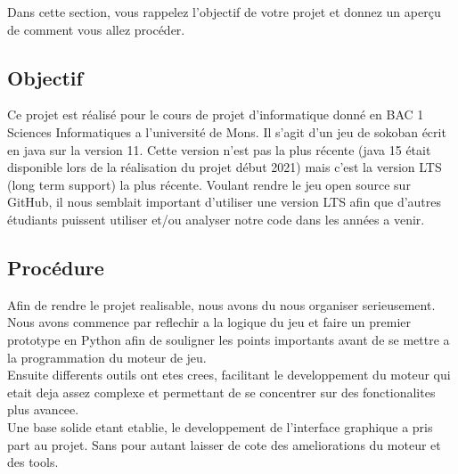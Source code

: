 \documentclass[../main.tex]{subfiles}
\begin{document}
Dans cette section, vous rappelez l'objectif de votre projet et donnez un aperçu de comment vous allez procéder.

\subsection{Objectif}
Ce projet est réalisé pour le cours de projet d'informatique donné en BAC 1 Sciences Informatiques a l'université de Mons.
Il s'agit d'un jeu de sokoban écrit en java sur la version 11.
Cette version n'est pas la plus récente (java 15 était disponible lors de la réalisation du projet début 2021) mais c'est la version LTS (long term support) la plus récente.
Voulant rendre le jeu open source sur GitHub, il nous semblait important d'utiliser une version LTS afin que d'autres étudiants puissent utiliser et/ou analyser notre code dans les années a venir.

\subsection{Procédure}
Afin de rendre le projet realisable, nous avons du nous organiser serieusement. \\
Nous avons commence par reflechir a la logique du jeu et faire un premier prototype en Python afin de souligner les points importants avant de se mettre a la programmation du moteur de jeu. \\
Ensuite differents outils ont etes crees, facilitant le developpement du moteur qui etait deja assez complexe et permettant de se concentrer sur des fonctionalites plus avancee. \\
Une base solide etant etablie, le developpement de l'interface graphique a pris part au projet. Sans pour autant laisser de cote des ameliorations du moteur et des tools.
\end{document}
